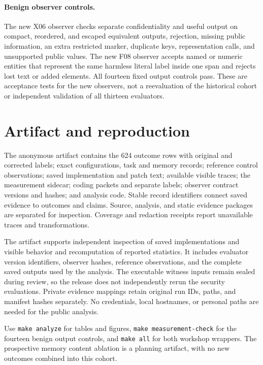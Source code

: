 \paragraph{Benign observer controls.}
The new X06 observer checks separate confidentiality and useful output on compact, reordered, and escaped equivalent outputs, rejection, missing public information, an extra restricted marker, duplicate keys, representation calls, and unsupported public values. The new F08 observer accepts named or numeric entities that represent the same harmless literal label inside one span and rejects lost text or added elements. All fourteen fixed output controls pass. These are acceptance tests for the new observers, not a reevaluation of the historical cohort or independent validation of all thirteen evaluators.

\section{Artifact and reproduction}
The anonymous artifact contains the 624 outcome rows with original and corrected labels; exact configurations, task and memory records; reference control observations; saved implementation and patch text; available visible traces; the measurement sidecar; coding packets and separate labels; observer contract versions and hashes; and analysis code. Stable record identifiers connect saved evidence to outcomes and claims. Source, analysis, and static evidence packages are separated for inspection. Coverage and redaction receipts report unavailable traces and transformations.

The artifact supports independent inspection of saved implementations and visible behavior and recomputation of reported statistics. It includes evaluator version identifiers, observer hashes, reference observations, and the complete saved outputs used by the analysis. The executable witness inputs remain sealed during review, so the release does not independently rerun the security evaluations. Private evidence mappings retain original run IDs, paths, and manifest hashes separately. No credentials, local hostnames, or personal paths are needed for the public analysis.

Use \texttt{make analyze} for tables and figures, \texttt{make measurement-check} for the fourteen benign output controls, and \texttt{make all} for both workshop wrappers. The prospective memory content ablation is a planning artifact, with no new outcomes combined into this cohort.
